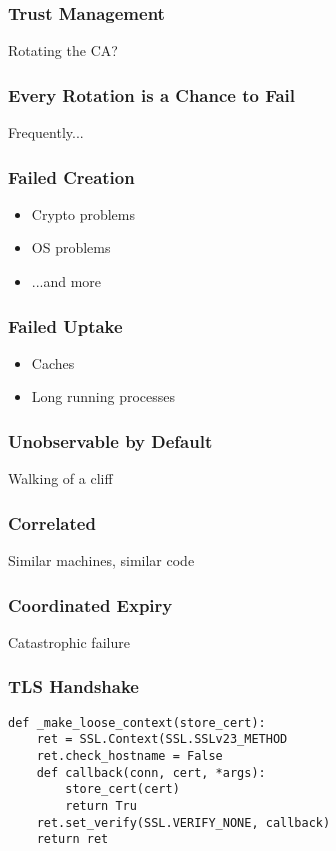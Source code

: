 \begin{frame}
\frametitle{Trust Management}

Rotating the CA?

\end{frame}

\begin{frame}
\frametitle{Every Rotation is a Chance to Fail}

Frequently...

\end{frame}


\begin{frame}
\frametitle{Failed Creation}
\begin{itemize}
\item Crypto problems
\item OS problems
\item ...and more
\end{itemize}
\end{frame}

\begin{frame}
\frametitle{Failed Uptake}
\begin{itemize}
\item Caches
\item Long running processes
\end{itemize}
\end{frame}


\begin{frame}
\frametitle{Unobservable by Default}
Walking of a cliff
\end{frame}

\begin{frame}
\frametitle{Correlated}
Similar machines, similar code
\end{frame}

\begin{frame}
\frametitle{Coordinated Expiry}

Catastrophic failure
\end{frame}

\begin{frame}
\frametitle{TLS Handshake}

\begin{lstlisting}
def _make_loose_context(store_cert):
    ret = SSL.Context(SSL.SSLv23_METHOD
    ret.check_hostname = False
    def callback(conn, cert, *args):
        store_cert(cert)
        return Tru
    ret.set_verify(SSL.VERIFY_NONE, callback)
    return ret
\end{lstlisting}
\end{frame}

